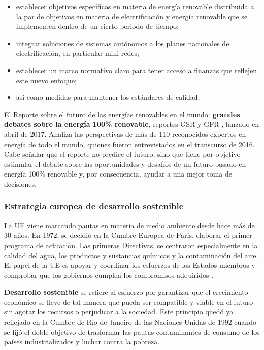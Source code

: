 \begin{itemize}
\item
  establecer objetivos específicos en materia de energía renovable
  distribuida a la par de objetivos en materia de electrificación y
  energía renovable que se implementen dentro de un cierto periodo de
  tiempo;
\item
  integrar soluciones de sistemas autónomos a los planes nacionales de
  electrificación, en particular mini-redes;
\item
  establecer un marco normativo claro para tener acceso a finanzas que
  reflejen este nuevo enfoque;
\item
  así como medidas para mantener los estándares de calidad.
\end{itemize}

El Reporte sobre el futuro de las energías renovables en el mundo:
\textbf{grandes debates sobre la energía 100\% renovable}, reportes GSR \cite{gsr} y GFR \cite{gfr}, lanzado en
abril de 2017. Analiza las perspectivas de más de 110 reconocidos
expertos en energía de todo el mundo, quienes fueron entrevistados en el
transcurso de 2016. Cabe señalar que el reporte no predice el futuro,
sino que tiene por objetivo estimular el debate sobre las oportunidades
y desafíos de un futuro basado en energía 100\% renovable y, por
consecuencia, ayudar a una mejor toma de decisiones.



\subsubsection{Estrategia europea de desarrollo
sostenible}\label{header-n72}

La UE viene marcando pautas en materia de medio ambiente desde hace más
de 30 años. En 1972, se decidió en la Cumbre Europea de París, elaborar
el primer programa de actuación. Las primeras Directivas, se centraron
especialmente en la calidad del agua, los productos y sustancias
químicas y la contaminación del aire. El papel de la UE es apoyar y
coordinar los esfuerzos de los Estados miembros y comprobar que los
gobiernos cumplen los compromisos adquiridos \cite{caballero11}.

\textbf{Desarrollo sostenible} se refiere al esfuerzo por garantizar que
el crecimiento económico se lleve de tal manera que pueda ser compatible
y viable en el futuro sin agotar los recursos o perjudicar a la
sociedad. Este principio quedó ya reflejado en la Cumbre de Río de
Janeiro de las Naciones Unidas de 1992 cuando se fijó el doble objetivo
de trasformar las pautas contaminantes de consumo de los países
industrializados y luchar contra la pobreza.

